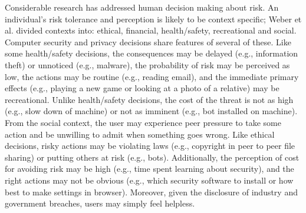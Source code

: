 Considerable research has addressed human decision making about risk. 
An individual’s risk tolerance and perception is likely to be context specific; Weber et al. \citeyear{weber2002} divided contexts into: ethical, financial, health/safety, recreational and social. 
Computer security and privacy decisions share features of several of these. 
Like some health/safety decisions, the consequences may be delayed (e.g., information theft) or unnoticed (e.g., malware), the probability of risk may be perceived as low, the actions may be routine (e.g., reading email), and the immediate primary effects (e.g., playing a new game or looking at a photo of a relative) may be recreational. 
Unlike health/safety decisions, the cost of the threat is not as high (e.g., slow down of machine) or not as imminent (e.g., bot installed on machine). 
From the social context, the user may experience peer pressure to take some action and be unwilling to admit when something goes wrong. 
Like ethical decisions, risky actions may be violating laws (e.g., copyright in peer to peer file sharing) or putting others at risk (e.g., bots).
Additionally, the perception of cost for avoiding risk may be high (e.g., time spent learning about security), and the right actions may not be obvious (e.g., which security software to install or how best to make settings in browser). 
Moreover, given the disclosure of industry and government breaches, users may simply feel helpless.

